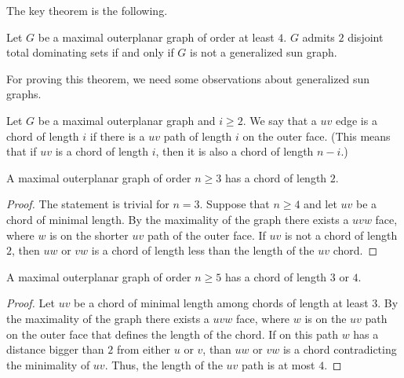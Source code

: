 The key theorem is the following.

\begin{thm}\label{thm:outerplanar}
  Let $G$ be a maximal outerplanar graph of order at least $4$. $G$ admits $2$ disjoint total dominating
  sets if and only if $G$ is not a generalized sun graph.
\end{thm}

For proving this theorem, we need some observations about generalized sun graphs.

\begin{definition}
  Let $G$ be a maximal outerplanar graph and $i \ge 2$. We say that a $uv$ edge is a chord
  of length $i$ if there is a $uv$ path of length $i$ on the outer face. (This means
  that if $uv$ is a chord of length $i$, then it is also a chord of length $n - i$.)
\end{definition}

\begin{lemma} \label{lem:two_chord}
  A maximal outerplanar graph of order $n \ge 3$ has a chord of length $2$.
\end{lemma}
\begin{proof}
  The statement is trivial for $n = 3$. Suppose that $n \ge 4$ and
  let $uv$ be a chord of minimal length. By
  the maximality of the graph there exists a $uvw$ face, where $w$ is on the shorter
  $uv$ path of the outer face. If $uv$ is not a chord of length $2$, then $uw$ or $vw$
  is a chord of length less than the length of the $uv$ chord.
\end{proof}

\begin{lemma} \label{lem:3-4_chord}
  A maximal outerplanar graph of order $n \ge 5$ has a chord of length $3$ or $4$.
\end{lemma}
\begin{proof}
  Let $uv$ be a chord of minimal length among chords of length at least $3$. By
  the maximality of the graph there exists a $uvw$ face, where $w$ is on the $uv$ path
  on the outer face that defines the length of the chord. If on this path $w$ has a distance
  bigger than $2$ from either $u$ or $v$, than $uw$ or $vw$ is a chord contradicting
  the minimality of $uv$. Thus, the length of the $uv$ path is at most $4$.
\end{proof}

